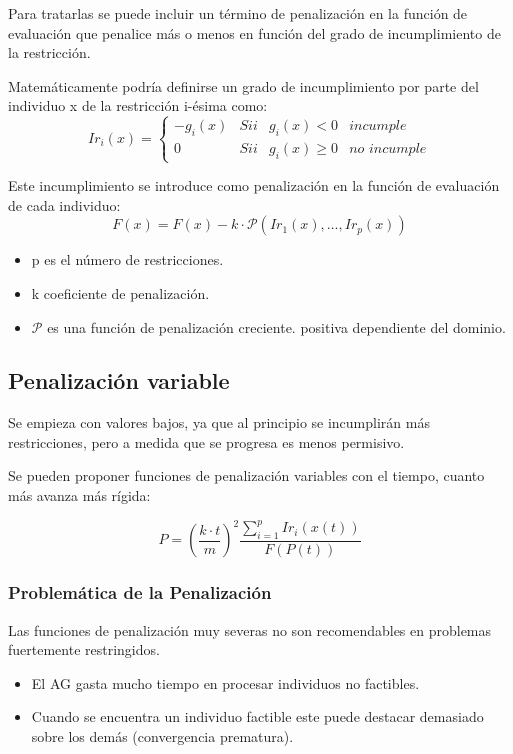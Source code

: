 \documentclass[12pt, twoside, openright]{report} %
\begin{document}
Para tratarlas se puede incluir un término de penalización en la función de evaluación que penalice más o menos en función del grado de incumplimiento de la restricción.

Matemáticamente podría definirse un grado de incumplimiento por parte del individuo x de la restricción i-ésima como:
$$Ir_i(x) = \left\{ \begin{array}{clll}
	-g_i(x) &  Sii & g_i(x)<0 & \textit{incumple} \\
	0 &  Sii & g_i(x)\geq 0 & \textit{no incumple}
\end{array} \right.$$

Este incumplimiento se introduce como penalización en la función de evaluación de cada individuo: 
$$F(x)=F(x)-k\cdot \mathcal{P}(Ir_1(x), ..., Ir_p(x))$$
\begin{itemize}
	\item p es el número de restricciones.
	\item k coeficiente de penalización.
	\item $\mathcal{P}$ es una función de penalización creciente.
	positiva dependiente del dominio.
\end{itemize}
\pagebreak

\subsection{Penalización variable}
Se empieza con valores bajos, ya que al principio se incumplirán más restricciones, pero a medida que se progresa es menos permisivo.

Se pueden proponer funciones de penalización variables con el tiempo, cuanto más avanza más rígida: 

$$P = \left(\frac {k \cdot t} {m} \right)^2 \frac {\sum^p_{i=1} Ir_i(x(t))} {F(P(t))}$$

\subsubsection{Problemática de la Penalización}
Las funciones de penalización muy severas no son recomendables en problemas fuertemente restringidos.
\begin{itemize}
	\item El AG gasta mucho tiempo en procesar individuos no factibles.
	\item Cuando se encuentra un individuo factible este puede destacar demasiado sobre los demás (convergencia prematura).
\end{itemize}
\end{document}
